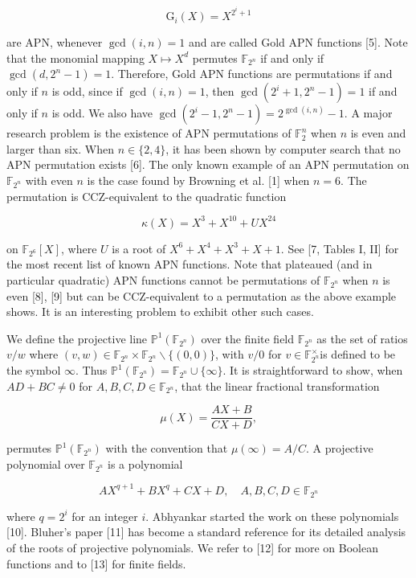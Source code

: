 \documentclass[10pt]{article}
\begin{document}
$$
\mathrm{G}_{i}(X)=X^{2^{i}+1}
$$

are APN, whenever $\operatorname{gcd}(i, n)=1$ and are called Gold APN functions [5]. Note that the monomial mapping $X \mapsto X^{d}$ permutes $\mathbb{F}_{2^{n}}$ if and only if $\operatorname{gcd}\left(d, 2^{n}-1\right)=1$. Therefore, Gold APN functions are permutations if and only if $n$ is odd, since if $\operatorname{gcd}(i, n)=1$, then $\operatorname{gcd}\left(2^{i}+1,2^{n}-1\right)=1$ if and only if $n$ is odd. We also have $\operatorname{gcd}\left(2^{i}-1,2^{n}-1\right)= 2^{\operatorname{gcd}(i, n)}-1$. A major research problem is the existence of APN permutations of $\mathbb{F}_{2}^{n}$ when $n$ is even and larger than six. When $n \in\{2,4\}$, it has been shown by computer search that no APN permutation exists [6]. The only known example of an APN permutation on $\mathbb{F}_{2^{n}}$ with even $n$ is the case found by Browning et al. [1] when $n=6$. The permutation is CCZ-equivalent to the quadratic function

$$
\kappa(X)=X^{3}+X^{10}+U X^{24}
$$

on $\mathbb{F}_{2^{6}}[X]$, where $U$ is a root of $X^{6}+X^{4}+X^{3}+X+1$. See [7, Tables I, II] for the most recent list of known APN functions. Note that plateaued (and in particular quadratic) APN functions cannot be permutations of $\mathbb{F}_{2^{n}}$ when $n$ is even [8], [9] but can be CCZ-equivalent to a permutation as the above example shows. It is an interesting problem to exhibit other such cases.

We define the projective line $\mathbb{P}^{1}\left(\mathbb{F}_{2^{n}}\right)$ over the finite field $\mathbb{F}_{2^{n}}$ as the set of ratios $v / w$ where $(v, w) \in \mathbb{F}_{2^{n}} \times \mathbb{F}_{2^{n}} \backslash \{(0,0)\}$, with $v / 0$ for $v \in \mathbb{F}_{2^{n}}^{\times}$is defined to be the symbol $\infty$. Thus $\mathbb{P}^{1}\left(\mathbb{F}_{2^{n}}\right)=\mathbb{F}_{2^{n}} \cup\{\infty\}$. It is straightforward to show, when $A D+B C \neq 0$ for $A, B, C, D \in \mathbb{F}_{2^{n}}$, that the linear fractional transformation

$$
\mu(X)=\frac{A X+B}{C X+D},
$$

permutes $\mathbb{P}^{1}\left(\mathbb{F}_{2^{n}}\right)$ with the convention that $\mu(\infty)=A / C$. A projective polynomial over $\mathbb{F}_{2^{n}}$ is a polynomial

$$
A X^{q+1}+B X^{q}+C X+D, \quad A, B, C, D \in \mathbb{F}_{2^{n}}
$$

where $q=2^{i}$ for an integer $i$. Abhyankar started the work on these polynomials [10]. Bluher's paper [11] has become a standard reference for its detailed analysis of the roots of projective polynomials. We refer to [12] for more on Boolean functions and to [13] for finite fields.
\end{document}
